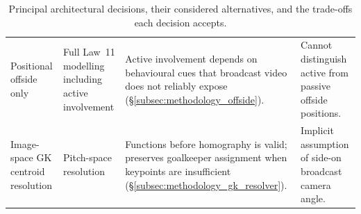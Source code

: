 \begin{table}[!htbp]
\begin{tabular}{
  >{\raggedright\arraybackslash}p{3.4cm}
  >{\raggedright\arraybackslash}p{2.8cm}
  >{\raggedright\arraybackslash}p{4.0cm}
  >{\raggedright\arraybackslash}p{3.6cm}
}
Positional offside only & Full Law~11 modelling including active involvement & Active involvement depends on behavioural cues that broadcast video does not reliably expose (§\ref{subsec:methodology_offside}). & Cannot distinguish active from passive offside positions. \\
Image-space GK centroid resolution & Pitch-space resolution & Functions before homography is valid; preserves goalkeeper assignment when keypoints are insufficient (§\ref{subsec:methodology_gk_resolver}). & Implicit assumption of side-on broadcast camera angle. \\
\bottomrule
\end{tabular}
\caption[Principal architectural decisions and trade-offs.]{Principal architectural decisions, their considered alternatives, and
the trade-offs each decision accepts.}
\label{tab:key_design_decisions}
\end{table}

